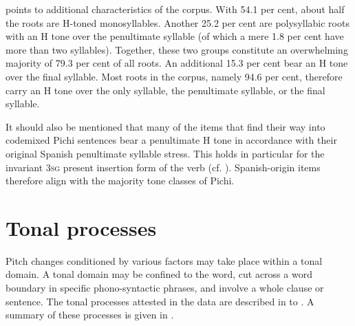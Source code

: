  points to additional characteristics of the corpus. With 54.1 per cent, about half the roots are H-toned monosyllables. Another 25.2 per cent are polysyllabic roots with an H tone over the penultimate syllable (of which a mere 1.8 per cent have more than two syllables). Together, these two groups constitute an overwhelming majority of 79.3 per cent of all roots. An additional 15.3 per cent bear an H tone over the final syllable. Most roots in the corpus, namely 94.6 per cent, therefore carry an H tone over the only syllable, the penultimate syllable, or the final syllable.

It should also be mentioned that many of the  items that find their way into codemixed Pichi sentences bear a penultimate H tone in accordance with their original Spanish penultimate syllable stress. This holds in particular for the invariant \textsc{3sg} present insertion form of the  verb (cf. ). Spanish-origin items therefore align with the majority tone classes of Pichi.  


\section{Tonal processes}\label{sec:3.2}

Pitch changes conditioned by various factors may take place within a tonal domain. A tonal domain may be confined to the word, cut across a word boundary in specific phono-syntactic phrases, and involve a whole clause or sentence. The tonal processes attested in the data are described in  to . A summary of these processes is given in .

